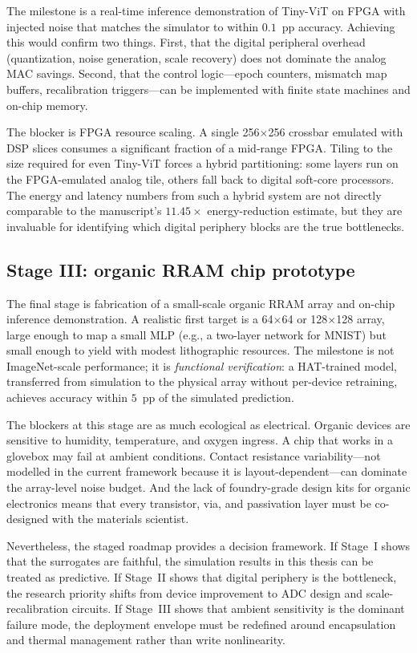 The milestone is a real-time inference demonstration of Tiny-ViT on FPGA with injected noise that matches the simulator to within $0.1$~pp accuracy.  Achieving this would confirm two things.  First, that the digital peripheral overhead (quantization, noise generation, scale recovery) does not dominate the analog MAC savings.  Second, that the control logic---epoch counters, mismatch map buffers, recalibration triggers---can be implemented with finite state machines and on-chip memory.

The blocker is FPGA resource scaling.  A single 256$\times$256 crossbar emulated with DSP slices consumes a significant fraction of a mid-range FPGA.  Tiling to the size required for even Tiny-ViT forces a hybrid partitioning: some layers run on the FPGA-emulated analog tile, others fall back to digital soft-core processors.  The energy and latency numbers from such a hybrid system are not directly comparable to the manuscript's $11.45\times$ energy-reduction estimate, but they are invaluable for identifying which digital periphery blocks are the true bottlenecks.

\subsection{Stage III: organic RRAM chip prototype}
\label{subsec:stage-chip}

The final stage is fabrication of a small-scale organic RRAM array and on-chip inference demonstration.  A realistic first target is a 64$\times$64 or 128$\times$128 array, large enough to map a small MLP (e.g., a two-layer network for MNIST) but small enough to yield with modest lithographic resources.  The milestone is not ImageNet-scale performance; it is \emph{functional verification}: a HAT-trained model, transferred from simulation to the physical array without per-device retraining, achieves accuracy within $5$~pp of the simulated prediction.

The blockers at this stage are as much ecological as electrical.  Organic devices are sensitive to humidity, temperature, and oxygen ingress.  A chip that works in a glovebox may fail at ambient conditions.  Contact resistance variability---not modelled in the current framework because it is layout-dependent---can dominate the array-level noise budget.  And the lack of foundry-grade design kits for organic electronics means that every transistor, via, and passivation layer must be co-designed with the materials scientist.

Nevertheless, the staged roadmap provides a decision framework.  If Stage~I shows that the surrogates are faithful, the simulation results in this thesis can be treated as predictive.  If Stage~II shows that digital periphery is the bottleneck, the research priority shifts from device improvement to ADC design and scale-recalibration circuits.  If Stage~III shows that ambient sensitivity is the dominant failure mode, the deployment envelope must be redefined around encapsulation and thermal management rather than write nonlinearity.

